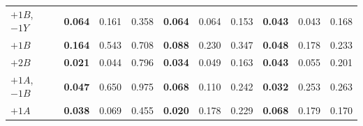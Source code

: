 \begin{table}[htbp]
\begin{tabular}{l|rrr|rrr|rrr}
$+1B$, $-1Y$ & \textbf{0.064} & 0.161 & 0.358 & \textbf{0.064} & 0.064 & 0.153 & \textbf{0.043} & 0.043 & 0.168 \\
$+1B$ & \textbf{0.164} & 0.543 & 0.708 & \textbf{0.088} & 0.230 & 0.347 & \textbf{0.048} & 0.178 & 0.233 \\
$+2B$ & \textbf{0.021} & 0.044 & 0.796 & \textbf{0.034} & 0.049 & 0.163 & \textbf{0.043} & 0.055 & 0.201 \\
$+1A$, $-1B$ & \textbf{0.047} & 0.650 & 0.975 & \textbf{0.068} & 0.110 & 0.242 & \textbf{0.032} & 0.253 & 0.263 \\
$+1A$ & \textbf{0.038} & 0.069 & 0.455 & \textbf{0.020} & 0.178 & 0.229 & \textbf{0.068} & 0.179 & 0.170 \\
\bottomrule
\end{tabular}
\end{table}